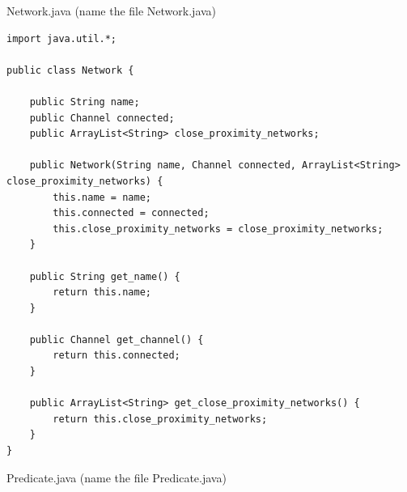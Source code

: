 \documentclass{article}
\begin{document}
Network.java (name the file Network.java)
\begin{lstlisting}
import java.util.*;

public class Network {

    public String name;
    public Channel connected;
    public ArrayList<String> close_proximity_networks;

    public Network(String name, Channel connected, ArrayList<String> close_proximity_networks) {
        this.name = name;
        this.connected = connected;
        this.close_proximity_networks = close_proximity_networks;
    }

    public String get_name() {
        return this.name;
    }

    public Channel get_channel() {
        return this.connected;
    }

    public ArrayList<String> get_close_proximity_networks() {
        return this.close_proximity_networks;
    }
}
\end{lstlisting}
Predicate.java (name the file Predicate.java)
\end{document}
